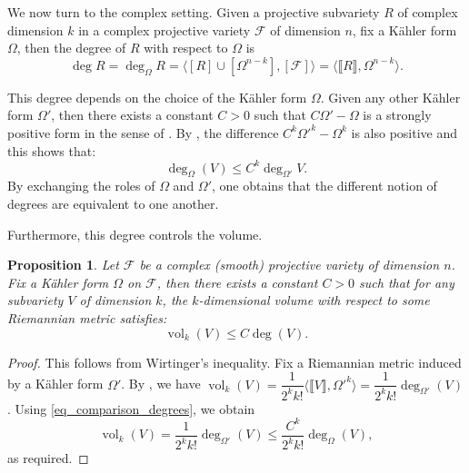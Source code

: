 \documentclass[12pt]{amsbook}%
\newtheorem{prop}[thm]{Proposition}
\theoremstyle{definition}
\theoremstyle{remark}
\numberwithin{section}{chapter}
\numberwithin{subsection}{section}
\numberwithin{figure}{chapter}
\DeclareMathOperator{\vol}{vol}
\newcommand\intcur[1]{\llbracket #1 \rrbracket}
\def\cF{{\mathscr{F}}}
\begin{document}
{{%


We now turn to the complex setting. 
Given a projective subvariety $R$ of complex dimension $k$ in a complex projective variety $\cF$ of dimension $n$, fix a K\"ahler form $\Omega$, then the degree of $R$ with respect to $\Omega$ is 
\begin{equation} \label{eq_degree_complex}
\deg R = \deg_{\Omega} R = \langle [ R ] \cup  [ \Omega^{n-k} ] , [\cF] \rangle  = \langle \intcur{R} , \Omega^{n-k} \rangle.
\end{equation} 

This degree depends on the choice of the K\"ahler form $\Omega$. 
Given any other K\"ahler form $\Omega'$, then there exists a constant $C>0$ such that $C \Omega' - \Omega$ is a strongly positive form in the sense of \cite[Definition 1.1]{demailly}. By \cite[Proposition 1.11]{demailly}, the difference $C^k \Omega'^k - \Omega^k$ is also positive and this shows that: 
\begin{equation} \label{eq_comparison_degrees}
 \deg_{\Omega}(V) \leqslant C^k \deg_{\Omega'} V.
\end{equation}
By exchanging the roles of $\Omega$ and $\Omega'$, one obtains that the different notion of degrees are equivalent to one another. 

Furthermore, this degree controls the volume. 

\begin{prop} Let $\cF$ be a complex (smooth) projective variety  of dimension $n$.
Fix a K\"ahler form $\Omega$ on $\cF$, then there exists a constant $C>0$ such that for any subvariety $V$ of dimension $k$, the $k$-dimensional volume with respect to some Riemannian metric satisfies: 
\begin{equation*}
\vol_k(V) \leqslant C \deg(V). 
\end{equation*}  
\end{prop}

\begin{proof} This follows from Wirtinger's inequality. Fix a Riemannian metric induced by a K\"ahler form $\Omega'$. 
 By \cite[Equation 1.24]{demailly}, we have $\vol_k (V) = \dfrac{1}{2^k k!} \langle \intcur{V}, \Omega'^k \rangle = \dfrac{1}{2^k k!} \deg_{\Omega'}(V) $. 
 Using \eqref{eq_comparison_degrees}, we obtain 
 \begin{equation*}
 \vol_k(V) = \dfrac{1}{2^k k!} \deg_{\Omega'}(V) \leqslant \dfrac{C^k}{2^k k!} \deg_{\Omega}(V), 
 \end{equation*}
 as required.
\end{proof}


}}
\end{document}
